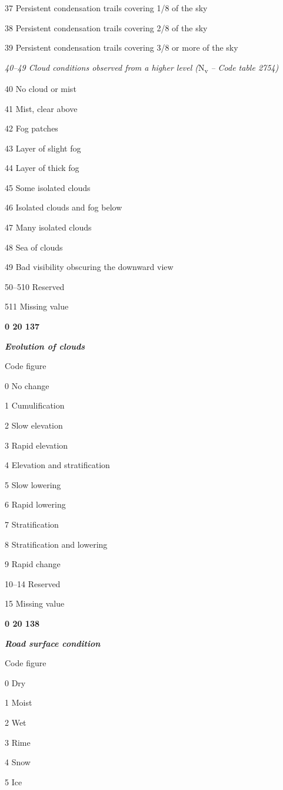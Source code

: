 37 Persistent condensation trails covering 1/8 of the sky

38 Persistent condensation trails covering 2/8 of the sky

39 Persistent condensation trails covering 3/8 or more of the sky

\emph{40--49 Cloud conditions observed from a higher level (}N\textsubscript{v} \emph{-- Code table 2754)}

40 No cloud or mist

41 Mist, clear above

42 Fog patches

43 Layer of slight fog

44 Layer of thick fog

45 Some isolated clouds

46 Isolated clouds and fog below

47 Many isolated clouds

48 Sea of clouds

49 Bad visibility obscuring the downward view

50--510 Reserved

511 Missing value

\textbf{0 20 137}

\emph{\textbf{Evolution of clouds}}

Code figure

0 No change

1 Cumulification

2 Slow elevation

3 Rapid elevation

4 Elevation and stratification

5 Slow lowering

6 Rapid lowering

7 Stratification

8 Stratification and lowering

9 Rapid change

10--14 Reserved

15 Missing value

\textbf{0 20 138}

\emph{\textbf{Road surface condition}}

Code figure

0 Dry

1 Moist

2 Wet

3 Rime

4 Snow

5 Ice

